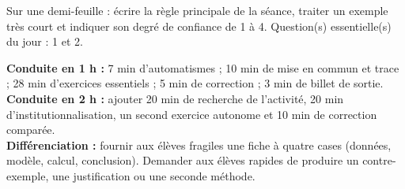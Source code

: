 \begin{sortie}Sur une demi-feuille : écrire la règle principale de la séance, traiter un exemple très court et indiquer son degré de confiance de 1 à 4. Question(s) essentielle(s) du jour : 1 et 2.\end{sortie}

\ifprof
\begin{methode}
\textbf{Conduite en 1 h :} 7 min d'automatismes ; 10 min de mise en commun et trace ; 28 min d'exercices essentiels ; 5 min de correction ; 3 min de billet de sortie.\\
\textbf{Conduite en 2 h :} ajouter 20 min de recherche de l'activité, 20 min d'institutionnalisation, un second exercice autonome et 10 min de correction comparée.\\
\textbf{Différenciation :} fournir aux élèves fragiles une fiche à quatre cases (données, modèle, calcul, conclusion). Demander aux élèves rapides de produire un contre-exemple, une justification ou une seconde méthode.
\end{methode}
\fi
